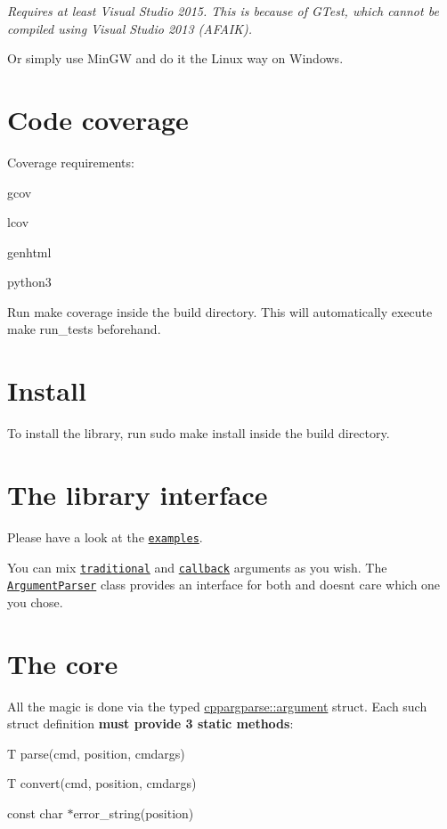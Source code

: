 {\itshape Requires at least Visual Studio 2015. This is because of G\+Test, which cannot be compiled using Visual Studio 2013 (A\+F\+A\+IK).}

Or simply use Min\+GW and do it the Linux way on Windows.

\section*{Code coverage}

Coverage requirements\+:
\begin{DoxyItemize}
\item {\ttfamily gcov}
\item {\ttfamily lcov}
\item {\ttfamily genhtml}
\item {\ttfamily python3}
\end{DoxyItemize}

Run {\ttfamily make coverage} inside the build directory. This will automatically execute {\ttfamily make run\+\_\+tests} beforehand.

\section*{Install}

To install the library, run {\ttfamily sudo make install} inside the build directory.

\section*{The library interface}

Please have a look at the \href{https://github.com/backraw/cppargparse/tree/master/samples}{\tt examples}.

You can mix \href{https://github.com/backraw/cppargparse/tree/master/samples/traditional}{\tt traditional} and \href{https://github.com/backraw/cppargparse/tree/master/samples/callback}{\tt callback} arguments as you wish. The \href{https://github.com/backraw/cppargparse/blob/master/include/cppargparse/parser.h#L242}{\tt Argument\+Parser} class provides an interface for both and doesn\textquotesingle{}t care which one you chose.

\section*{The core}

All the magic is done via the typed {\ttfamily \hyperlink{structcppargparse_1_1argument}{cppargparse\+::argument}} struct. Each such struct definition {\bfseries must provide 3 static methods}\+:
\begin{DoxyItemize}
\item {\ttfamily T parse(cmd, position, cmdargs)}
\item {\ttfamily T convert(cmd, position, cmdargs)}
\item {\ttfamily const char $\ast$error\+\_\+string(position)}
\end{DoxyItemize}

